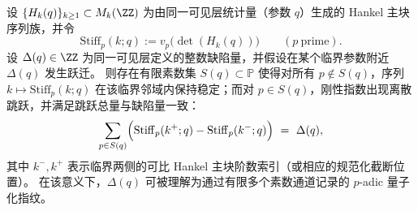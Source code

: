 
\begin{conjecture}\label{conj:xi-hankel-stiffness-jump-defect-quantization}
设 \(\{H_k(q)\}_{k\ge 1}\subset M_k(\ZZ)\) 为由同一可见层统计量（参数 \(q\)）生成的 Hankel 主块序列族，并令
\[
\mathrm{Stiff}_p(k;q):=v_p\!\bigl(\det(H_k(q))\bigr)
\qquad(p\ \text{prime}).
\]
设 \(\Delta(q)\in\ZZ\) 为同一可见层定义的整数缺陷量，并假设在某个临界参数附近 \(\Delta(q)\) 发生跃迁。
则存在有限素数集 \(S(q)\subset\mathbb P\) 使得对所有 \(p\notin S(q)\)，序列 \(k\mapsto \mathrm{Stiff}_p(k;q)\) 在该临界邻域内保持稳定；而对 \(p\in S(q)\)，刚性指数出现离散跳跃，并满足跳跃总量与缺陷量一致：
\[
\sum_{p\in S(q)}\Bigl(\mathrm{Stiff}_p(k^+;q)-\mathrm{Stiff}_p(k^-;q)\Bigr)\ =\ \Delta(q),
\]
其中 \(k^-,k^+\) 表示临界两侧的可比 Hankel 主块阶数索引（或相应的规范化截断位置）。
在该意义下，\(\Delta(q)\) 可被理解为通过有限多个素数通道记录的 \(p\)-adic 量子化指纹。
\end{conjecture}

\endinput


